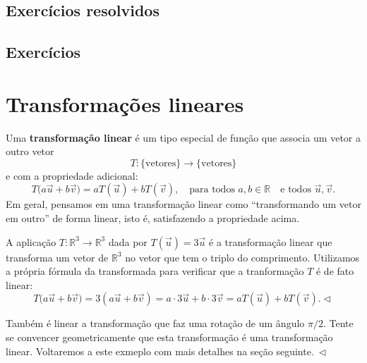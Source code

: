 \documentclass[../livro.tex]{subfiles}
\begin{document}
\subsection*{Exercícios resolvidos}

\construirExeresol

\subsection*{Exercícios}

\construirExer


\section{Transformações lineares}


Uma \textbf{transformação linear} é um tipo especial de função que associa um vetor a outro vetor
\begin{equation}
T: \{ \text{vetores} \} \to \{ \text{vetores} \}
\end{equation} e com a propriedade adicional:
\begin{equation}
T\big( a \vec{u} + b \vec{v} \big) = aT(\vec{u}) + bT(\vec{v}), \quad \text{para todos } a, b \in \mathbb{R} \quad \text{e todos } \vec{u}, \vec{v}.
\end{equation}
Em geral, pensamos em uma transformação linear como ``transformando um vetor em outro'' de forma linear, isto é, satisfazendo a propriedade acima.


\begin{example}
A aplicação $T: \mathbb{R}^3 \to \mathbb{R}^3$ dada por $T(\vec{u}) = 3\vec{u}$ é a transformação linear que transforma um vetor de $\mathbb{R}^3$ no vetor que tem o triplo do comprimento. Utilizamos a própria fórmula da transformada para verificar que a tranformação $T$ é de fato linear:
\begin{equation}
T\big( a \vec{u} + b \vec{v} \big) = 3 ( a \vec{u} + b \vec{v} ) = a \cdot 3 \vec{u} + b \cdot 3 \vec{v} = aT(\vec{u}) + bT(\vec{v}). \lhd
\end{equation}
\end{example}


\begin{example}\label{exp:4}
Também é linear a transformação que faz uma rotação de um ângulo $\pi / 2$. Tente se convencer geometricamente que esta transformação é uma transformação linear. Voltaremos a este exmeplo com mais detalhes na seção seguinte$. \ \lhd$
\end{example}
\end{document}
